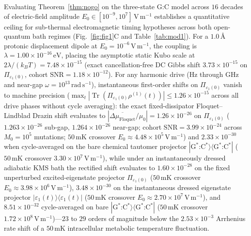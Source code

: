 \documentclass[10pt,letterpaper]{article}
\theoremstyle{plain}
\theoremstyle{definition}
\newcommand{\Tr}{\operatorname{Tr}}
\begin{document}
Evaluating Theorem~\ref{thm:nogo} on the three-state G:C model across $16$ decades of electric-field amplitude $E_0 \in [10^{-9}, 10^7]\,\mathrm{V\,m^{-1}}$ establishes a quantitative ceiling for sub-thermal electromagnetic timing hypotheses \cite{garcia2026dna} across both open-quantum bath regimes (Fig.~\ref{fig:fig1}C and Table~\ref{tab:mod1}). For a $1.0\,\text{\AA}$ protonic displacement dipole at $E_0 = 10^{-6}\,\mathrm{V\,m^{-1}}$, the coupling is $\lambda = 1.00 \times 10^{-16}\,\mathrm{eV}$, placing the asymptotic static Kubo scale at $2\lambda/(k_B T) = 7.48 \times 10^{-15}$ (exact cancellation-free DC Gibbs shift $3.73 \times 10^{-15}$ on $\Pi_{\varepsilon_1(0)}$, cohort $\mathrm{SNR} = 1.18 \times 10^{-12}$). For any harmonic drive ($\mathrm{Hz}$ through $\mathrm{GHz}$ and near-gap $\omega = 10^{13}\,\mathrm{rad\,s^{-1}}$), instantaneous first-order shifts on $\Pi_{\varepsilon_1(0)}$ vanish to machine precision ($\max_t |\Tr(\Pi_{\varepsilon_1(0)}\rho^{(1)}(t))| \le 1.26 \times 10^{-15}$ across all drive phases without cycle averaging): the exact fixed-dissipator Floquet--Lindblad Drazin shift evaluates to $|\overline{\Delta\mu_{\mathrm{Floquet}}}/\mu_0| = 1.26 \times 10^{-26}$ on $\Pi_{\varepsilon_1(0)}$ ($1.263 \times 10^{-26}$ sub-gap, $1.264 \times 10^{-26}$ near-gap; cohort $\mathrm{SNR} = 3.99 \times 10^{-24}$ across $M_0 = 10^5$ mutations; $50\,\mathrm{mK}$ crossover $E_0 \approx 4.48 \times 10^5\,\mathrm{V\,m^{-1}}$) and $2.33 \times 10^{-30}$ when cycle-averaged on the bare chemical tautomer projector $|\mathrm{G}^*\text{:}\mathrm{C}^*\rangle\langle\mathrm{G}^*\text{:}\mathrm{C}^*|$ ($50\,\mathrm{mK}$ crossover $3.30 \times 10^7\,\mathrm{V\,m^{-1}}$), while under an instantaneously dressed adiabatic KMS bath the rectified shift evaluates to $1.60 \times 10^{-28}$ on the fixed unperturbed excited-eigenstate projector $\Pi_{\varepsilon_1(0)}$ ($50\,\mathrm{mK}$ crossover $E_0 \approx 3.98 \times 10^6\,\mathrm{V\,m^{-1}}$), $3.48 \times 10^{-30}$ on the instantaneous dressed eigenstate projector $|\varepsilon_1(t)\rangle\langle\varepsilon_1(t)|$ ($50\,\mathrm{mK}$ crossover $E_0 \approx 2.70 \times 10^7\,\mathrm{V\,m^{-1}}$), and $8.51 \times 10^{-32}$ cycle-averaged on bare $|\mathrm{G}^*\text{:}\mathrm{C}^*\rangle\langle\mathrm{G}^*\text{:}\mathrm{C}^*|$ ($50\,\mathrm{mK}$ crossover $1.72 \times 10^8\,\mathrm{V\,m^{-1}}$)---$23$ to $29$ orders of magnitude below the $2.53 \times 10^{-3}$ Arrhenius rate shift of a $50\,\mathrm{mK}$ intracellular metabolic temperature fluctuation.
\end{document}
